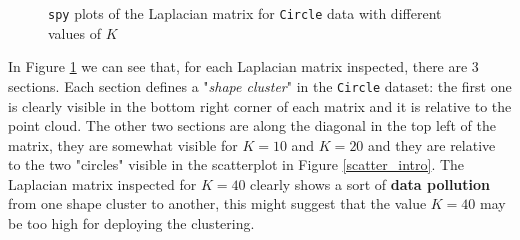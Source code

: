 \begin{figure}[H]
    \caption{\texttt{spy} plots of the Laplacian matrix for \texttt{Circle} data with different values of \(K\)}
    \label{LaplacianSpy_circle}
  \end{figure}
  In Figure \ref{LaplacianSpy_circle} we can see that, for each Laplacian matrix inspected, there are 3 sections. Each section defines a "\textit{shape cluster}" in the \texttt{Circle} dataset: the first one is clearly visible in the bottom right corner of each matrix and it is relative to the point cloud. The other two sections are along the diagonal in the top left of the matrix, they are somewhat visible for \(K= 10\) and \(K= 20\) and they are relative to the two "circles" visible in the scatterplot in Figure \ref{scatter_intro}. The Laplacian matrix inspected for \(K= 40\) clearly shows a sort of \textbf{data pollution} from one shape cluster to another, this might suggest that the value \(K= 40\) may be too high for deploying the clustering.
